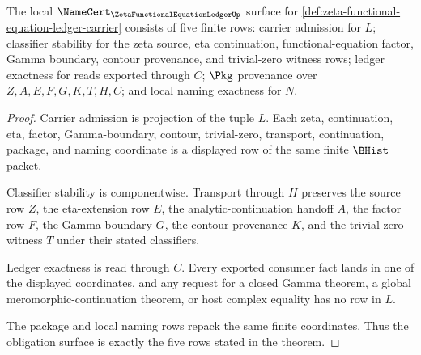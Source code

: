\begin{theorem}
\label{thm:zeta-functional-equation-ledger-namecert-obligations}
The local $\NameCert_{\ZetaFunctionalEquationLedgerUp}$ surface for \autoref{def:zeta-functional-equation-ledger-carrier} consists of five finite rows: carrier admission for $L$; classifier stability for the zeta source, eta continuation, functional-equation factor, Gamma boundary, contour provenance, and trivial-zero witness rows; ledger exactness for reads exported through $C$; $\Pkg$ provenance over $Z,A,E,F,G,K,T,H,C$; and local naming exactness for $N$.
\end{theorem}
\begin{proof}
Carrier admission is projection of the tuple $L$. Each zeta, continuation, eta, factor, Gamma-boundary, contour, trivial-zero, transport, continuation, package, and naming coordinate is a displayed row of the same finite $\BHist$ packet.

Classifier stability is componentwise. Transport through $H$ preserves the source row $Z$, the eta-extension row $E$, the analytic-continuation handoff $A$, the factor row $F$, the Gamma boundary $G$, the contour provenance $K$, and the trivial-zero witness $T$ under their stated classifiers.

Ledger exactness is read through $C$. Every exported consumer fact lands in one of the displayed coordinates, and any request for a closed Gamma theorem, a global meromorphic-continuation theorem, or host complex equality has no row in $L$.

The package and local naming rows repack the same finite coordinates. Thus the obligation surface is exactly the five rows stated in the theorem.
\end{proof}

